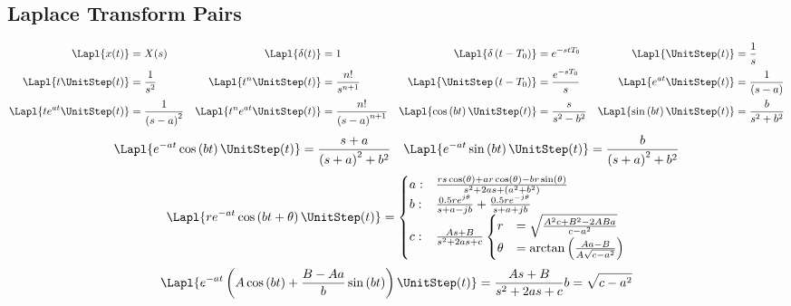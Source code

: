 		\vspace{-5mm}
		
	\subsection*{Laplace Transform Pairs} \label{subsec:Laplace Transform Pairs}
		\begin{align*}
			\Lapl \lbrace x (t) \rbrace &= X(s) & \Lapl \lbrace \delta (t) \rbrace &= 1 & \Lapl \lbrace \delta \left( t-T_{0} \right) \rbrace &= e^{-stT_{0}} & \Lapl \lbrace \UnitStep (t) \rbrace &= \frac{1}{s} \\
			\Lapl \lbrace t \UnitStep (t) \rbrace &= \frac{1}{s^{2}} & \Lapl \lbrace t^{n}\UnitStep (t) \rbrace &= \frac{n!}{s^{n+1}} & \Lapl \lbrace \UnitStep \left( t-T_{0} \right) \rbrace &= \frac{e^{-sT_{0}}}{s} & \Lapl \lbrace e^{at} \UnitStep (t) \rbrace &= \frac{1}{\left( s-a \right)} \\
			\Lapl \lbrace t e^{at} \UnitStep (t) \rbrace &= \frac{1}{\left( s-a \right)^{2}} & \Lapl \lbrace t^{n} e^{at} \UnitStep (t) \rbrace &= \frac{n!}{\left( s-a \right)^{n+1}} & \Lapl \lbrace \cos \left( bt \right) \UnitStep (t) \rbrace &= \frac{s}{s^{2}-b^{2}} & \Lapl \lbrace \sin \left( bt \right) \UnitStep (t) \rbrace &= \frac{b}{s^{2}+b^{2}} \\
		\end{align*}
		\begin{align*}
			\Lapl \lbrace e^{-at} \cos \left( bt \right) \UnitStep (t) \rbrace &= \frac{s+a}{\left( s+a \right)^{2} + b^{2}} & \Lapl \lbrace e^{-at} \sin \left( bt \right) \UnitStep (t) \rbrace &= \frac{b}{\left( s+a \right)^{2} + b^{2}} \\
		\end{align*}
		\begin{equation*}
			\Lapl \lbrace r e^{-at} \cos \left( bt + \theta \right) \UnitStep (t) \rbrace =
				\begin{cases}
					a: & \frac{rs \cos \left( \theta \right) + ar \cos \left( \theta \right) - br \sin \left( \theta \right)}{s^{2} + 2as + \left( a^{2} + b^{2} \right)} \\
					b: & \frac{0.5 re^{j \theta}}{s+a-jb} + \frac{0.5 re^{-j \theta}}{s+a+jb} \\
					c: & \frac{As+B}{s^{2} + 2as + c}
						\begin{cases}
							r &=\sqrt{\frac{A^{2}c + B^{2} -2ABa}{c-a^{2}}} \\
							\theta &= \arctan \left( \frac{Aa-B}{A \sqrt{c-a^{2}}} \right)
						\end{cases} \\
				\end{cases}
		\end{equation*}
		\begin{equation*}
			\Lapl \lbrace e^{-at} \left( A \cos \left( bt \right) + \frac{B-Aa}{b} \sin \left( bt \right) \right) \UnitStep (t) \rbrace = \frac{As+B}{s^{2} + 2as + c} \\
			b = \sqrt{c-a^{2}}
		\end{equation*}
